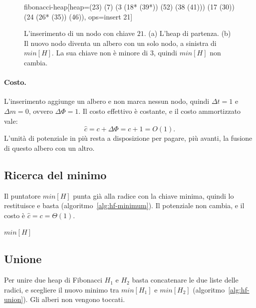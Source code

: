 \begin{figure}[htbp]
\begin{widget}{fibonacci-heap}[heap={(23) (7) (3 (18* (39*)) (52) (38 (41))) (17 (30)) (24 (26* (35)) (46))}, ops={insert 21}]
\end{widget}
\caption{L'inserimento di un nodo con chiave $21$. (a) L'heap di partenza. (b) Il nuovo nodo diventa un albero con un solo nodo, a sinistra di $\mathit{min}[H]$. La sua chiave non è minore di $3$, quindi $\mathit{min}[H]$ non cambia.}
\label{fig:hf-inserimento}
\end{figure}

\paragraph{Costo.}
L'inserimento aggiunge un albero e non marca nessun nodo, quindi $\Delta t = 1$ e $\Delta m = 0$, ovvero $\Delta\Phi = 1$. Il costo effettivo è costante, e il costo ammortizzato vale:
\[
\hat{c} = c + \Delta\Phi = c + 1 = O(1).
\]
L'unità di potenziale in più resta a disposizione per pagare, più avanti, la fusione di questo albero con un altro.

\subsection{Ricerca del minimo}\label{sec:hf-minimum}
Il puntatore $\mathit{min}[H]$ punta già alla radice con la chiave minima, quindi \Minimum{} lo restituisce e basta (algoritmo~\ref{alg:hf-minimum}). Il potenziale non cambia, e il costo è $\hat{c} = c = \Theta(1)$.

\begin{algorithm}[htbp]
\caption{La ricerca del nodo con la chiave minima, a cui punta $\mathit{min}[H]$.}\label{alg:hf-minimum}
\begin{algorithmic}[1]
  \State \Return $\mathit{min}[H]$
\EndProcedure
\end{algorithmic}
\end{algorithm}

\subsection{Unione}\label{sec:hf-union}
Per unire due heap di Fibonacci $H_1$ e $H_2$ basta concatenare le due liste delle radici, e scegliere il nuovo minimo tra $\mathit{min}[H_1]$ e $\mathit{min}[H_2]$ (algoritmo~\ref{alg:hf-union}). Gli alberi non vengono toccati.

